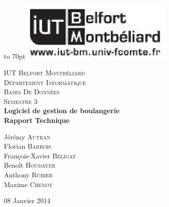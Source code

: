 \documentclass[12pt]{report}
\begin{document}
{
    \begin{titlepage}

    \vbox to 70pt{\hfill\includegraphics[height=3cm]{images/logo-iut.eps}}\
    \begin{center}

    \textsc{\LARGE IUT Belfort Montbéliard}\\[0.7cm]
    \textsc{\LARGE Département Informatique}\\[1.0cm]
    \textsc{\Large Bases De Données}\\[0.5cm]
    \textsc{\Large Semestre 3}\\[5cm]


    {\huge \bfseries Logiciel de gestion de boulangerie}\\[0.5cm]
    {\huge \bfseries Rapport Technique}\\[5cm]

    \begin{large}
    Jérémy \textsc{Autran}\\[0.3em]
    Florian \textsc{Barrois}\\[0.3em]
    François-Xavier \textsc{Béligat}\\[0.3em]
    Benoît \textsc{Houdayer}\\[0.3em]
    Anthony \textsc{Ruhier}\\[0.3em]
    Maxime \textsc{Chenot}\\[0.3em]

    \end{large}

    \vfill

    {\large 08 Janvier 2014}

    \end{center}
    \end{titlepage}
    }

    {\clearpage\mbox{}\thispagestyle{empty}\clearpage}
    \setcounter{page}{1}
    {\large{}}


    
    
    
    
    



    \tableofcontents

\end{document}
